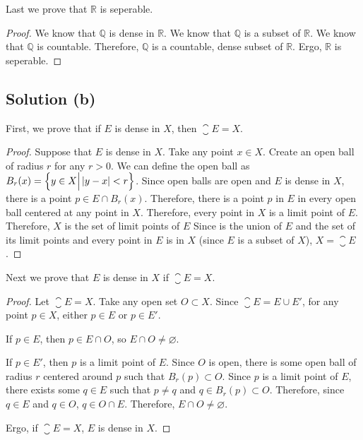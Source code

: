 \documentclass[11pt]{article}
\begin{document}
            Last we prove that $\mathbb{R}$ is seperable.
            \begin{proof}
                We know that $\mathbb{Q}$ is dense in $\mathbb{R}$.
                We know that $\mathbb{Q}$ is a subset of $\mathbb{R}$.
                We know that $\mathbb{Q}$ is countable.
                Therefore, $\mathbb{Q}$ is a countable, dense subset of $\mathbb{R}$.
                Ergo, $\mathbb{R}$ is seperable.
            \end{proof}

    \pagebreak
    \subsection{Solution (b)}
        First, we prove that if $E$ is dense in $X$, then $\closure{E} = X$.
        \begin{proof}
            Suppose that $E$ is dense in $X$.
            Take any point $x \in X$.
            Create an open ball of radius $r$ for any $r > 0$.
            We can define the open ball as $B_r(x) = \left\{ y \in X \Big| \left| y - x \right| < r \right\}$.
            Since open balls are open and $E$ is dense in $X$, there is a point $p \in E \cap B_r(x)$.
            Therefore, there is a point $p$ in $E$ in every open ball centered at any point in $X$.
            Therefore, every point in $X$ is a limit point of $E$.
            Therefore, $X$ is the set of limit points of $E$
            Since  is the union of $E$ and the set of its limit points and every point in $E$ is in $X$ (since $E$ is a subset of $X$), $X = \closure{E}$.
        \end{proof}

        Next we prove that $E$ is dense in $X$ if $\closure{E} = X$.
        \begin{proof}
            Let $\closure{E} = X$.
            Take any open set $O \subset X$.
            Since $\closure{E} = E \cup E'$, for any point $p \in X$, either $p \in E$ or $p \in E'$.

            If $p \in E$, then $p \in E \cap O$, so $E \cap O \neq \varnothing$.

            If $p \in E'$, then $p$ is a limit point of $E$.
            Since $O$ is open, there is some open ball of radius $r$ centered around $p$ such that $B_r(p) \subset O$.
            Since $p$ is a limit point of $E$, there exists some $q \in E$ such that $p \neq q$ and $q \in B_r(p) \subset O$.
            Therefore, since $q \in E$ and $q \in O$, $q \in O \cap E$.
            Therefore, $E \cap O \neq \varnothing$.

            Ergo, if $\closure{E} = X$, $E$ is dense in $X$.
        \end{proof}
\end{document}
